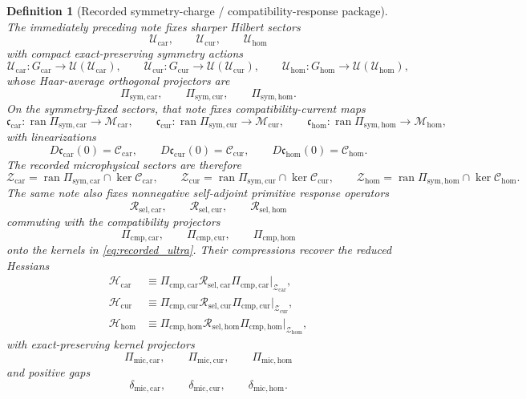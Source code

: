 \documentclass[11pt]{article}
\newcommand{\UltraTensorClass}{\mathscr Z_{\mathrm{car}}}
\newcommand{\UltraRelabelClass}{\mathscr Z_{\mathrm{cur}}}
\newcommand{\UltraFreeClass}{\mathscr Z_{\mathrm{hom}}}
\newcommand{\UltraCarProj}{\Pi_{\mathrm{mic,car}}}
\newcommand{\UltraCurProj}{\Pi_{\mathrm{mic,cur}}}
\newcommand{\UltraHomProj}{\Pi_{\mathrm{mic,hom}}}
\newcommand{\UltraCarGap}{\delta_{\mathrm{mic,car}}}
\newcommand{\UltraCurGap}{\delta_{\mathrm{mic,cur}}}
\newcommand{\UltraHomGap}{\delta_{\mathrm{mic,hom}}}
\newcommand{\RootTensorClass}{\mathscr U_{\mathrm{car}}}
\newcommand{\RootRelabelClass}{\mathscr U_{\mathrm{cur}}}
\newcommand{\RootFreeClass}{\mathscr U_{\mathrm{hom}}}
\newcommand{\TensorSymProj}{\Pi_{\mathrm{sym,car}}}
\newcommand{\CurSymProj}{\Pi_{\mathrm{sym,cur}}}
\newcommand{\HomSymProj}{\Pi_{\mathrm{sym,hom}}}
\newcommand{\TensorCompat}{\mathcal C_{\mathrm{car}}}
\newcommand{\CurCompat}{\mathcal C_{\mathrm{cur}}}
\newcommand{\HomCompat}{\mathcal C_{\mathrm{hom}}}
\newcommand{\TensorHess}{\mathcal H_{\mathrm{car}}}
\newcommand{\CurHess}{\mathcal H_{\mathrm{cur}}}
\newcommand{\HomHess}{\mathcal H_{\mathrm{hom}}}
\newcommand{\TensorCmpProj}{\Pi_{\mathrm{cmp,car}}}
\newcommand{\CurCmpProj}{\Pi_{\mathrm{cmp,cur}}}
\newcommand{\HomCmpProj}{\Pi_{\mathrm{cmp,hom}}}
\newcommand{\TensorSymGroup}{G_{\mathrm{car}}}
\newcommand{\CurSymGroup}{G_{\mathrm{cur}}}
\newcommand{\HomSymGroup}{G_{\mathrm{hom}}}
\newcommand{\TensorSymAct}{\mathscr U_{\mathrm{car}}}
\newcommand{\CurSymAct}{\mathscr U_{\mathrm{cur}}}
\newcommand{\HomSymAct}{\mathscr U_{\mathrm{hom}}}
\newcommand{\TensorCurrent}{\mathfrak c_{\mathrm{car}}}
\newcommand{\CurCurrent}{\mathfrak c_{\mathrm{cur}}}
\newcommand{\HomCurrent}{\mathfrak c_{\mathrm{hom}}}
\newcommand{\TensorResp}{\mathcal R_{\mathrm{sel,car}}}
\newcommand{\CurResp}{\mathcal R_{\mathrm{sel,cur}}}
\newcommand{\HomResp}{\mathcal R_{\mathrm{sel,hom}}}
\newtheorem{definition}{Definition}
\begin{document}
\begin{definition}[Recorded symmetry-charge / compatibility-response package]
\label{def:recorded_package}
The immediately preceding note fixes sharper Hilbert sectors
\[
\RootTensorClass,\qquad
\RootRelabelClass,\qquad
\RootFreeClass
\]
with compact exact-preserving symmetry actions
\[
\TensorSymAct:\TensorSymGroup\to\mathcal U(\RootTensorClass),\qquad
\CurSymAct:\CurSymGroup\to\mathcal U(\RootRelabelClass),\qquad
\HomSymAct:\HomSymGroup\to\mathcal U(\RootFreeClass),
\]
whose Haar-average orthogonal projectors are
\[
\TensorSymProj,\qquad
\CurSymProj,\qquad
\HomSymProj.
\]
On the symmetry-fixed sectors, that note fixes compatibility-current maps
\[
\TensorCurrent:\operatorname{ran}\TensorSymProj\to\mathscr M_{\mathrm{car}},\qquad
\CurCurrent:\operatorname{ran}\CurSymProj\to\mathscr M_{\mathrm{cur}},\qquad
\HomCurrent:\operatorname{ran}\HomSymProj\to\mathscr M_{\mathrm{hom}},
\]
with linearizations
\begin{equation}
D\TensorCurrent(0)=\TensorCompat,\qquad
D\CurCurrent(0)=\CurCompat,\qquad
D\HomCurrent(0)=\HomCompat.
\label{eq:recorded_compat_linearizations}
\end{equation}
The recorded microphysical sectors are therefore
\begin{equation}
\UltraTensorClass=\operatorname{ran}\TensorSymProj\cap\ker\TensorCompat,
\qquad
\UltraRelabelClass=\operatorname{ran}\CurSymProj\cap\ker\CurCompat,
\qquad
\UltraFreeClass=\operatorname{ran}\HomSymProj\cap\ker\HomCompat.
\label{eq:recorded_ultra}
\end{equation}
The same note also fixes nonnegative self-adjoint primitive response operators
\[
\TensorResp,\qquad
\CurResp,\qquad
\HomResp
\]
commuting with the compatibility projectors
\[
\TensorCmpProj,\qquad
\CurCmpProj,\qquad
\HomCmpProj
\]
onto the kernels in \eqref{eq:recorded_ultra}. Their compressions recover the reduced Hessians
\begin{equation}
\begin{aligned}
\TensorHess
&\equiv
\TensorCmpProj\TensorResp\TensorCmpProj\big|_{\UltraTensorClass},
\\
\CurHess
&\equiv
\CurCmpProj\CurResp\CurCmpProj\big|_{\UltraRelabelClass},
\\
\HomHess
&\equiv
\HomCmpProj\HomResp\HomCmpProj\big|_{\UltraFreeClass},
\end{aligned}
\label{eq:recorded_hessians}
\end{equation}
with exact-preserving kernel projectors
\[
\UltraCarProj,\qquad
\UltraCurProj,\qquad
\UltraHomProj
\]
and positive gaps
\[
\UltraCarGap,\qquad
\UltraCurGap,\qquad
\UltraHomGap.
\]


\end{definition}
\end{document}
